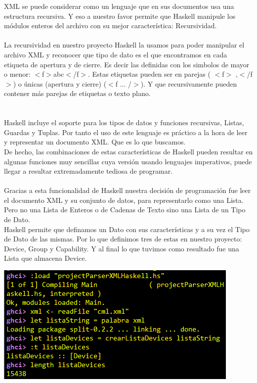 \documentclass[11pt]{article} %
\begin{document}
XML se puede considerar como un lenguaje que en sus documentos usa una estructura recursiva. Y eso a nuestro favor permite que Haskell manipule los módulos enteros del archivo con su mejor característica: Recursividad.\\ \\
La recursividad en nuestro proyecto Haskell la usamos para poder manipular el archivo XML y reconocer que tipo de dato es el que encontramos en cada etiqueta de apertura y de cierre. Es decir las definidas con los simbolos de mayor o menor: $<$f$>$abc$<$/f$>$. Estas etiquetas pueden ser en parejas  ( $<$f$>$ ,$<$/f$>$) o únicas (apertura y cierre) ($<$f ... /$>$). Y que recursivamente pueden contener más parejas de etiquetas o texto plano.\\ \\ \\
Haskell incluye el soporte para los tipos de datos y funciones recursivas, Listas, Guardas y Tuplas. Por tanto el uso de este lenguaje es práctico a la hora de leer y representar un documento XML. Que es lo que buscamos. \\  De hecho, las combinaciones de estas características de Haskell pueden resultar en algunas funciones muy sencillas cuya versión usando lenguajes imperativos, puede llegar a resultar extremadamente tediosa de programar.
\\ \\
Gracias a esta funcionalidad de Haskell nuestra decisión de programación fue leer el documento XML y su conjunto de datos, para representarlo como una Lista. Pero no una Lista de Enteros o de Cadenas de Texto sino una Lista de un Tipo de Dato. \\ Haskell permite que definamos un Dato con sus características y a su vez el Tipo de Dato de las mismas. Por lo que definimos tres de estas en nuestro proyecto: Device, Group y Capability. Y al final lo que tuvimos como resultado fue una Lista que almacena Device.
\begin{center}
\includegraphics[scale=0.7]{Imagenes/CargarDevices.png}
\end{center}
\end{document}

